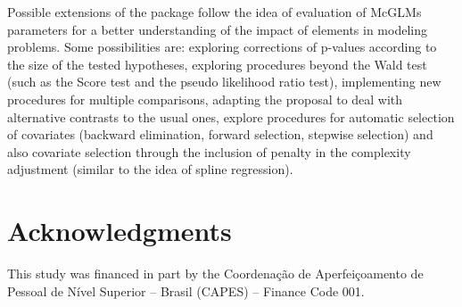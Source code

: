 \documentclass[article]{jss}\usepackage[]{graphicx}\usepackage[]{xcolor}
\begin{document}
Possible extensions of the  package follow the idea of evaluation of McGLMs parameters for a better understanding of the impact of elements in modeling problems. Some possibilities are: exploring corrections of p-values according to the size of the tested hypotheses, exploring procedures beyond the Wald test (such as the Score test and the pseudo likelihood ratio test), implementing new procedures for multiple comparisons, adapting the proposal to deal with alternative contrasts to the usual ones, explore procedures for automatic selection of covariates (backward elimination, forward selection, stepwise selection) and also covariate selection through the inclusion of penalty in the complexity adjustment (similar to the idea of spline regression).


\section*{Acknowledgments}

\begin{leftbar}
This study was financed in part by the Coordenação de Aperfeiçoamento de Pessoal de Nível Superior – Brasil (CAPES) – Finance Code 001.
\end{leftbar}





\newpage




\end{document}
